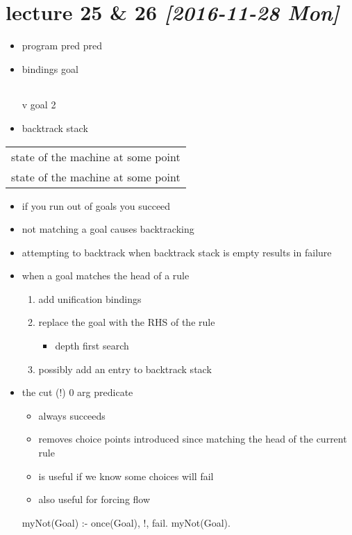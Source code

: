 \documentclass[11pt]{article}
\begin{document}
\section{lecture 25 \& 26 \textit{[2016-11-28 Mon]}}
\label{sec-22}
\begin{itemize}
\item program
pred
pred
\item bindings
goal
\begin{center}
\begin{tabular}{}
\\
\end{tabular}
\end{center}
  v
goal 2
\item backtrack stack
\end{itemize}
\begin{center}
\begin{tabular}{l}
state of the machine at some point\\
state of the machine at some point\\
\end{tabular}
\end{center}
\begin{itemize}
\item if you run out of goals you succeed
\item not matching a goal causes backtracking
\item attempting to backtrack when backtrack stack is empty results in failure
\item when a goal matches the head of a rule
\begin{enumerate}
\item add unification bindings
\item replace the goal with the RHS of the rule
\begin{itemize}
\item depth first search
\end{itemize}
\item possibly add an entry to backtrack stack
\end{enumerate}
\item the cut (!) 0 arg predicate
\begin{itemize}
\item always succeeds
\item removes choice points introduced since matching the head of the current rule
\item is useful if we know some choices will fail
\item also useful for forcing flow
\end{itemize}
myNot(Goal) :- once(Goal), !, fail.
myNot(Goal).
\end{itemize}
\end{document}
